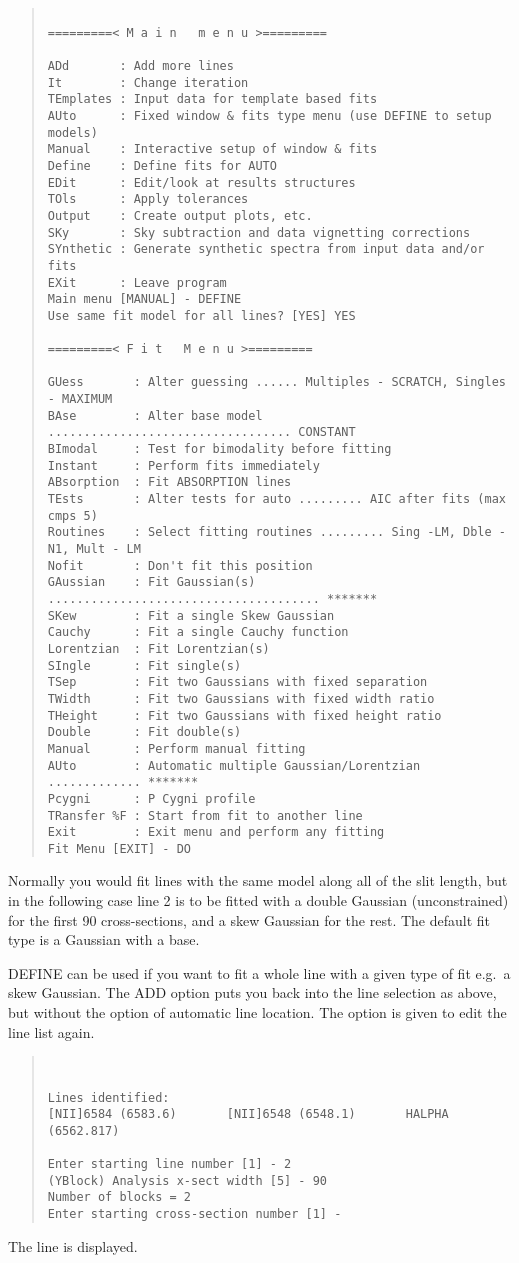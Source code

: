 \begin{quote}\begin{verbatim}

=========< M a i n   m e n u >=========

ADd       : Add more lines
It        : Change iteration
TEmplates : Input data for template based fits
AUto      : Fixed window & fits type menu (use DEFINE to setup models)
Manual    : Interactive setup of window & fits
Define    : Define fits for AUTO
EDit      : Edit/look at results structures
TOls      : Apply tolerances
Output    : Create output plots, etc.
SKy       : Sky subtraction and data vignetting corrections
SYnthetic : Generate synthetic spectra from input data and/or fits
EXit      : Leave program
Main menu [MANUAL] - DEFINE
Use same fit model for all lines? [YES] YES

=========< F i t   M e n u >=========

GUess       : Alter guessing ...... Multiples - SCRATCH, Singles - MAXIMUM
BAse        : Alter base model .................................. CONSTANT
BImodal     : Test for bimodality before fitting
Instant     : Perform fits immediately
ABsorption  : Fit ABSORPTION lines
TEsts       : Alter tests for auto ......... AIC after fits (max cmps 5)
Routines    : Select fitting routines ......... Sing -LM, Dble - N1, Mult - LM
Nofit       : Don't fit this position
GAussian    : Fit Gaussian(s) ...................................... *******
SKew        : Fit a single Skew Gaussian
Cauchy      : Fit a single Cauchy function
Lorentzian  : Fit Lorentzian(s)
SIngle      : Fit single(s)
TSep        : Fit two Gaussians with fixed separation
TWidth      : Fit two Gaussians with fixed width ratio
THeight     : Fit two Gaussians with fixed height ratio
Double      : Fit double(s)
Manual      : Perform manual fitting
AUto        : Automatic multiple Gaussian/Lorentzian ............. *******
Pcygni      : P Cygni profile
TRansfer %F : Start from fit to another line
Exit        : Exit menu and perform any fitting
Fit Menu [EXIT] - DO
\end{verbatim}\end{quote}
Normally you would fit lines with the same model along all of
the slit length, but in the following case line 2 is to be fitted with a
double Gaussian (unconstrained) for the first 90 cross-sections, and a
skew Gaussian for the rest.
The default fit type is a Gaussian with a base.

DEFINE can be used if you want to fit a whole line with a given type of
fit e.g.\ a skew Gaussian.
The ADD option puts you back into the line selection as above, but
without the option of automatic line location.
The option is given to edit the line list again.
\begin{quote}\begin{verbatim}


Lines identified:
[NII]6584 (6583.6)       [NII]6548 (6548.1)       HALPHA (6562.817)

Enter starting line number [1] - 2
(YBlock) Analysis x-sect width [5] - 90
Number of blocks = 2
Enter starting cross-section number [1] -
\end{verbatim}\end{quote}
The line is displayed.


